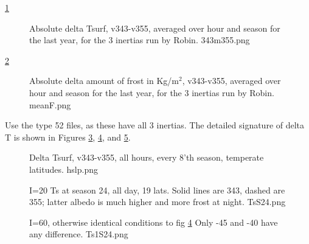 \documentclass{article}
\begin{document}
\ref{343m355}
\begin{figure}[!ht] 
\caption[Delta Tsurf]{Absolute delta Tsurf, v343-v355, averaged over hour and season for 
the last year, for the 3 inertias run by Robin. 
\label{343m355}  343m355.png }
\end{figure} 

\ref{meanF}
\begin{figure}[!ht] 
\caption[Delta Frost]{Absolute delta amount of frost in Kg/m$^2$, v343-v355, averaged over hour and season for the last year, for the 3 inertias run by Robin.
\label{meanF} meanF.png }
\end{figure} 

Use the type 52 files, as these have all 3 inertias.
 The detailed signature of delta T is shown in Figures \ref{hslp},  \ref{TsS24}, and \ref{Ts1S24}.

  
\begin{figure}[!ht] 
\caption[I=10 Delta Tsurf]{Delta Tsurf, v343-v355, all hours, every 8'th season, temperate latitudes.
\label{hslp}  hslp.png }
\end{figure} 
  
\begin{figure}[!ht] 
\caption[I=20: Ts at season 24]{I=20 Ts at season 24, all day, 19 lats. Solid lines
  are 343, dashed are 355; latter albedo is much higher and more frost
  at night.
\label{TsS24}  TsS24.png }
\end{figure} 

\begin{figure}[!ht] 
\caption[I=60: Ts at season 24]{I=60, otherwise identical conditions to fig
  \ref{TsS24} Only -45 and -40 have any difference.
\label{Ts1S24}  Ts1S24.png }
\end{figure} 
\end{document}
